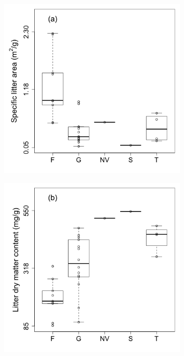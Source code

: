 \documentclass{article}
\begin{document}
\begin{figure}
\centering
	\begin{subfigure}[!ht]{0.3\textwidth}
		\includegraphics[width=\textwidth]{figs/SLA_boxplot.png}
	\end{subfigure}
	\begin{subfigure}[!ht]{0.3\textwidth}
		\includegraphics[width=\textwidth]{figs/DMC_boxplot.png}

\end{subfigure}
\end{figure}
\end{document}
